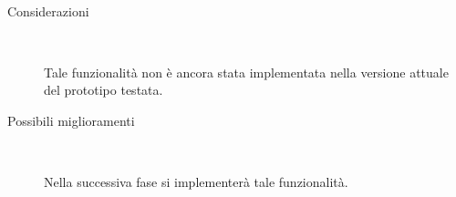 \documentclass[../../Sperimentazione.tex]{subfiles}
\begin{document}
\begin{tcolorbox}[fonttitle=\bfseries, 
								adjusted title={\Large Prova 2A.1}, 
								breakable, 
								sharp corners=south,
								colback=white, 
								colframe=white!60!black]
\begin{description}[leftmargin=0.7cm,labelwidth=!]
\begin{description}
        				\end{description}
        				
        			\tcbline
        			
        			\item[Analisi risultati] \ \par
        				\begin{description}
        					\item[Considerazioni] \ \par
        						Tale funzionalità non è ancora stata implementata nella versione attuale del prototipo testata.
        					
        					\item[Possibili miglioramenti] \ \par 
        						Nella successiva fase si implementerà tale funzionalità.
        				\end{description}
        				
				\end{description}  
				
			\end{tcolorbox}



	
	\newpage
\end{document}
